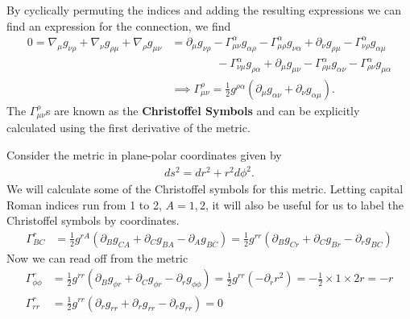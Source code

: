 \documentclass[10pt]{article}
\begin{document}
            By cyclically permuting the indices and adding the resulting expressions we can find an expression for the connection, we find 
            \begin{equation}
            \begin{aligned}
            0= \nabla_\mu g_{\nu \rho} +  \nabla_\nu g_{\rho \mu } +  \nabla_\rho g_{\mu \nu} &=  \partial_\mu g_{\nu \rho}  - \Gamma^{\alpha}_{\mu \nu} g_{\alpha \rho} - \Gamma^{\alpha}_{\mu \rho} g_{\nu \alpha} + \partial_\nu g_{\rho \mu}  - \Gamma^{\alpha}_{\nu \rho} g_{\alpha \mu} \\&\quad \quad \quad \quad- \Gamma^{\alpha}_{\nu \mu} g_{\rho \alpha}  + \partial_\mu g_{\mu \nu}  - \Gamma^{\alpha}_{\rho \mu} g_{\alpha \nu} - \Gamma^{\alpha}_{\rho \nu} g_{\mu \alpha} \\
            &\implies \Gamma^{\rho}_{\mu \nu} = \frac{1}{2} g^{\rho \alpha} \left( \partial_\mu g_{\alpha \nu} + \partial_\nu g_{\alpha \mu} \right).
            \end{aligned}
            \end{equation}
            The $\Gamma^\rho_{\mu \nu}$s are known as the \textbf{Christoffel Symbols} and can be explicitly calculated using the first derivative of the metric. 
    
    
\begin{example}
Consider the metric in plane-polar coordinates given by
\begin{align*}
ds^2 = dr^2 + r^2 d\phi^2.
\end{align*}
We will calculate some of the Christoffel symbols for this metric. Letting capital Roman indices run from 1 to 2, $A=1,2$, it will also be useful for us to label the Christoffel symbols by coordinates. 
\begin{align*}
\Gamma^r_{BC} &= \frac{1}{2} g^{rA} \left( \partial_B g_{CA} + \partial_C g_{BA} - \partial_A g_{BC} \right) = \frac{1}{2} g^{rr}  \left( \partial_B g_{Cr} + \partial_C g_{Br} - \partial_r g_{BC} \right)
\end{align*}
Now we can read off from the metric 
\begin{align*}
\Gamma^r_{\phi\phi} &= \frac{1}{2} g^{rr}  \left( \partial_B g_{\phi r} + \partial_C g_{\phi r} - \partial_r g_{\phi \phi } \right)= \frac{1}{2} g^{rr}  \left(  - \partial_r r^2\right) =-\frac{1}{2} \times 1 \times 2 r= -r\\
\Gamma^r_{rr} &= \frac{1}{2} g^{rr} \left(\partial_r g_{rr} + \partial_r g_{rr} - \partial_r g_{rr}\right)= 0
\end{align*}
\end{example}
    
\end{document}
